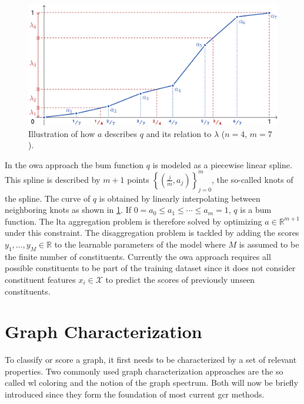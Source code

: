 \begin{figure}[ht]
	\centering
	\includegraphics[width=0.75\linewidth]{gfx/related-work/bum.pdf}
	\caption[Illustration of how a \ac{bum} function is described as a linear spline and its relation to the \ac{owa} weights.]{
		Illustration of how \textcolor{t_blue}{$a$} describes \textcolor{t_blue}{$q$} and its relation to \textcolor{t_red}{$\lambda$} ($n = 4$, $m = 7$).
	}\label{fig:related:bum}
\end{figure}
In the \ac{owa} approach the \ac{bum} function $q$ is modeled as a piecewise linear spline.
This spline is described by $m+1$ points ${\left\{ \left( \frac{j}{m}, a_j \right) \right\}}_{j = 0}^{m}$, the so-called knots of the spline. %
The curve of $q$ is obtained by linearly interpolating between neighboring knots as shown in \cref{fig:related:bum}.
If $0 = a_0 \leq a_1 \leq \cdots \leq a_m = 1$, $q$ is a \ac{bum} function.
The \ac{lta} aggregation problem is therefore solved by optimizing $a \in \mathbb{R}^{m + 1}$ under this constraint.
The disaggregation problem is tackled by adding the scores $y_1, \dots, y_M \in \mathbb{R}$ to the learnable parameters of the model where $M$ is assumed to be the finite number of constituents.
Currently the \ac{owa} approach requires all possible constituents to be part of the training dataset since it does not consider constituent features $x_i \in \mathcal{X}$ to predict the scores of previously unseen constituents.

\section{Graph Characterization}%
\label{sec:related:character}

To classify or score a graph, it first needs to be characterized by a set of relevant properties.
Two commonly used graph characterization approaches are the so called \acl{wl} coloring and the notion of the graph spectrum.
Both will now be briefly introduced since they form the foundation of most current \ac{gcr} methods.

